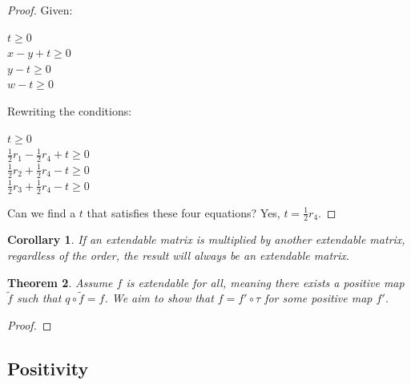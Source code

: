 \documentclass[11pt]{amsart}
\newtheorem{thm}{Theorem}[section]
\newtheorem{cor}[thm]{Corollary}
\theoremstyle{definition}
\begin{document}
\begin{proof}
Given:
\begin{center}
    $t \geq 0$ \\
    $x - y + t \geq 0$ \\
    $y - t \geq 0$ \\
    $w - t \geq 0$
\end{center}

Rewriting the conditions:

\begin{center}
    $t \geq 0$\\
    $\frac{1}{2}r_1 - \frac{1}{2}r_4 + t \geq 0$ \\
    $\frac{1}{2}r_2 + \frac{1}{2}r_4 - t \geq 0$ \\
    $\frac{1}{2}r_3 + \frac{1}{2}r_4 - t \geq 0$
\end{center}

Can we find a \( t \) that satisfies these four equations? Yes, \( t = \frac{1}{2}r_4 \).
\end{proof}

\begin{cor}
    If an extendable matrix is multiplied by another extendable matrix, regardless of the order, the result will always be an extendable matrix.
\end{cor}


\begin{thm}
    Assume \( f \) is extendable for all, meaning there exists a positive map \( \tilde{f} \) such that \( q \circ \tilde{f} = f \). We aim to show that \( f = f' \circ \tau \) for some positive map \( f' \).
\end{thm}

\begin{proof}
    
\end{proof}

\subsection{Positivity}

\begin{center}
\end{center}
\end{document}
